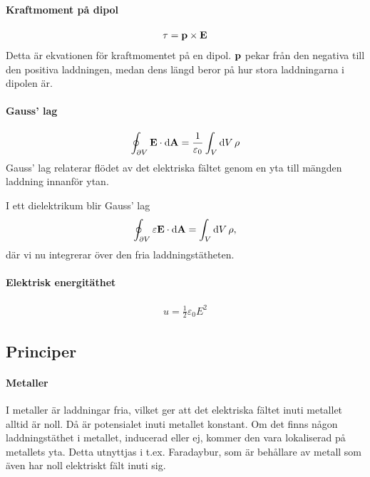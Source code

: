 \paragraph{Kraftmoment på dipol}
\begin{align*}
	\vect{\tau} = \vect{p}\times\vect{E}
\end{align*}
Detta är ekvationen för kraftmomentet på en dipol. $\vect{p}$ pekar från den negativa till den positiva laddningen, medan dens längd beror på hur stora laddningarna i dipolen är.

\deriv

\paragraph{Gauss' lag}
\begin{align*}
	\oint_{\partial V}\vect{E}\cdot\dd{\vect{A}} = \frac{1}{\varepsilon_0}\int_{V}\dd{V}\rho
\end{align*}
Gauss' lag relaterar flödet av det elektriska fältet genom en yta till mängden laddning innanför ytan.

I ett dielektrikum blir Gauss' lag
\begin{align*}
	\oint_{\partial V}\varepsilon\vect{E}\cdot\dd{\vect{A}} = \int_{V}\dd{V}\rho,
\end{align*}
där vi nu integrerar över den fria laddningstätheten.

\deriv

\paragraph{Elektrisk energitäthet}
\begin{align*}
	u = \frac{1}{2}\varepsilon_0E^2
\end{align*}

\deriv

\subsection{Principer}

\paragraph{Metaller}
I metaller är laddningar fria, vilket ger att det elektriska fältet inuti metallet alltid är noll. Då är potensialet inuti metallet konstant. Om det finns någon laddningstäthet i metallet, inducerad eller ej, kommer den vara lokaliserad på metallets yta. Detta utnyttjas i t.ex. Faradaybur, som är behållare av metall som även har noll elektriskt fält inuti sig.

